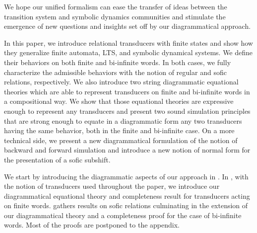 We hope our unified formalism can ease the transfer of ideas between the transition system and symbolic dynamics communities and stimulate the emergence of new questions and insights set off by our diagrammatical approach. 

\smallskip

In this paper, we introduce relational transducers with finite states and show how they generalize finite automata, LTS, and symbolic dynamical systems. We define their behaviors on both finite and bi-infinite words. 
In both cases, we fully characterize the admissible behaviors with the notion of regular and sofic relations, respectively. 
We also introduce two string diagrammatic equational theories which are able to represent transducers on finite and bi-infinite words in a compositional way. 
We show that those equational theories are expressive enough to represent any transducers and present two sound simulation principles that are strong enough to equate in a diagrammatic form any two transducers having the same behavior, both in the finite and bi-infinite case. 
On a more technical side, we present a new diagrammatical formulation of the notion of backward and forward simulation and introduce a new notion of normal form for the presentation of a sofic subshift.

\smallskip

We start by introducing the diagrammatic aspects of our approach in . 
In , with the notion of transducers used throughout the paper, we introduce our diagrammatical equational theory and completeness result for transducers acting on finite words. 
 gathers results on sofic relations culminating in the extension of our diagrammatical theory and a completeness proof for the case of bi-infinite words. 
Most of the proofs are postponed to the appendix.

